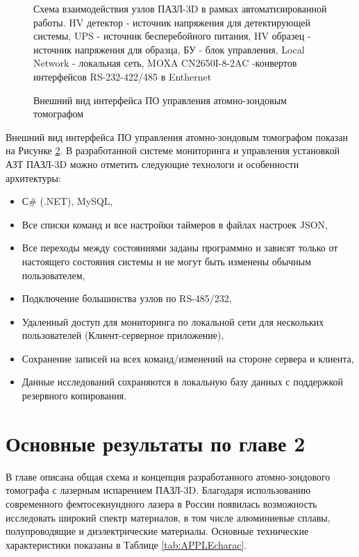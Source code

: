 \begin{figure}[htb]
	\caption{Схема взаимодействия узлов ПАЗЛ-3D в рамках автоматизированной работы. HV детектор - источник напряжения для детектирующей системы, UPS - источник бесперебойного питания, HV образец - источник напряжения для образца, БУ - блок управления, Local Network - локальная сеть, MOXA CN2650I-8-2AC -конвертов интерфейсов RS-232-422/485 в Enthernet}
	\label{fig:auto_APPLE_scheme}
\end{figure}

\begin{figure}[htb]
	\caption{Внешний вид интерфейса ПО управления атомно-зондовым томографом}
	\label{fig:auto_APPLE_Jabber}
\end{figure}

Внешний вид интерфейса ПО управления атомно-зондовым томографом показан на Рисунке \cref{fig:auto_APPLE_Jabber}. В разработанной системе мониторинга и управления установкой АЗТ ПАЗЛ-3D можно отметить следующие  технологи и особенности архитектуры:

\begin{itemize}[beginpenalty=10000]
	\item С$\#$ (.NET), MySQL,
	\item Все списки команд и все настройки таймеров в файлах настроек JSON,
	\item Все переходы между состояниями заданы программно и зависят только от настоящего состояния системы и не могут быть изменены обычным пользователем,
	\item Подключение большинства узлов по RS-485/232,
	\item Удаленный доступ для мониторинга по локальной сети для нескольких пользователей (Клиент-серверное приложение),
	\item Сохранение записей на всех команд/изменений на стороне сервера и клиента,
	\item Данные исследований сохраняются в локальную базу данных с поддержкой резервного копирования.
\end{itemize}


\FloatBarrier
\section{Основные результаты по главе 2}\label{sec:ch2/sec7}

В главе описана общая схема и концепция разработанного атомно-зондового томографа с лазерным испарением ПАЗЛ-3D. Благодаря использованию современного фемтосекнундного лазера в России появилась возможность исследовать широкий спектр материалов, в том числе алюминиевые сплавы, полупроводящие и диэлектрические материалы. Основные технические характеристики показаны в Таблице \cref{tab:APPLEcharac}.

